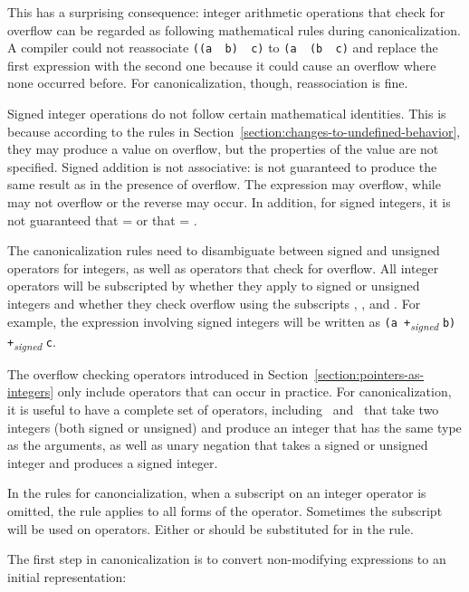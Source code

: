This has a surprising consequence: integer arithmetic operations that
check for overflow can be regarded as following mathematical rules
during canonicalization. A compiler could not reassociate \texttt{((a
\plusovf\ b) \plusovf\ c)} to \texttt{(a
\plusovf\ (b \plusovf\ c)} and replace the first
expression with the second one because it could cause an overflow where
none occurred before. For canonicalization, though, reassociation is
fine.

Signed integer operations do not follow certain mathematical identities.
This is because according to the rules in 
Section~\ref{section:changes-to-undefined-behavior}, they may produce
a value on overflow, but the properties of the value are not specified.
Signed addition is not associative:  is not
guaranteed to produce the same result as  in the
presence of overflow. The expression  may overflow, while
 may not overflow or the reverse may occur. In addition,
for signed integers, it is not guaranteed that  =
 or that  = .

The canonicalization rules need to disambiguate between signed and
unsigned operators for integers, as well as operators that check for
overflow. All integer operators will be subscripted by whether they
apply to signed or unsigned integers and whether they check overflow 
using the subscripts , , and
. For example, the expression  involving
signed integers will be written as \texttt{(a
+}\emph{\textsubscript{signed}} \texttt{b)
+}\emph{\textsubscript{signed}} \texttt{c}.

The overflow checking operators introduced in
Section~\ref{section:pointers-as-integers} only include
operators that can occur in practice. For canonicalization, it is useful
to have a complete set of operators, including
\plusovf\ and \minusovf\ that
take two integers (both signed or unsigned) and produce an integer that
has the same type as the arguments, as well as unary negation that takes
a signed or unsigned integer and produces a signed integer.

In the rules for canoncialization, when a subscript on an integer
operator is omitted, the rule applies to all forms of the operator.
Sometimes the subscript  will be used on operators. Either
 or  should be substituted for 
in the rule.

The first step in canonicalization is to convert non-modifying
expressions to an initial representation:

